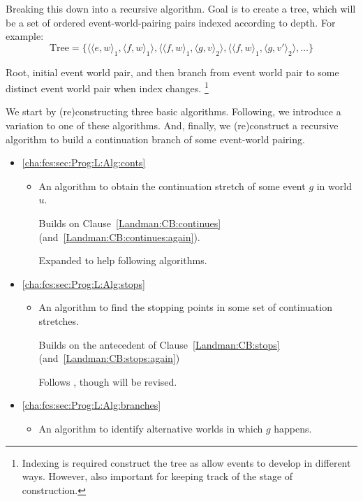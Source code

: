 \begin{note}
  Breaking this down into a recursive algorithm.
  Goal is to create a tree, which will be a set of ordered event-world-pairing pairs indexed according to depth.
  For example:
  \[\text{Tree} = \{\langle \langle e,w \rangle_{1}, \langle f,w \rangle_{1} \rangle, \langle \langle f,w \rangle_{1}, \langle g,v \rangle_{2} \rangle, \langle \langle f,w \rangle_{1}, \langle g,v' \rangle_{2} \rangle, \dots \}\]

  Root, initial event world pair, and then branch from event world pair to some distinct event world pair when index changes.%
  \footnote{
    Indexing is required construct the tree as allow events to develop in different ways.
    However, also important for keeping track of the stage of construction.
  }

  We start by (re)constructing three basic algorithms.
  Following, we introduce a variation to one of these algorithms.
  And, finally, we (re)construct a recursive algorithm to build a continuation branch of some event-world pairing.

  \begin{itemize}[noitemsep]
  \item
    \hfill%
    \autoref{cha:fcs:sec:Prog:L:Alg:conts}
    \begin{itemize}
    \item
      An algorithm to obtain the continuation stretch of some event \(g\) in world \(u\).

      Builds on Clause~\ref{Landman:CB:continues} (and~\ref{Landman:CB:continues:again}).

      Expanded to help following algorithms.
    \end{itemize}
  \item
    \hfill%
    \autoref{cha:fcs:sec:Prog:L:Alg:stops}
    \begin{itemize}
    \item
      An algorithm to find the stopping points in some set of continuation stretches.

      Builds on the antecedent of Clause~\ref{Landman:CB:stops} (and~\ref{Landman:CB:stops:again})

      Follows \citeauthor{Landman:1992wh}, though will be revised.
    \end{itemize}
  \item
    \hfill%
    \autoref{cha:fcs:sec:Prog:L:Alg:branches}
    \begin{itemize}
    \item
      An algorithm to identify alternative worlds in which \(g\) happens.


\end{itemize}
\end{itemize}
\end{note}

